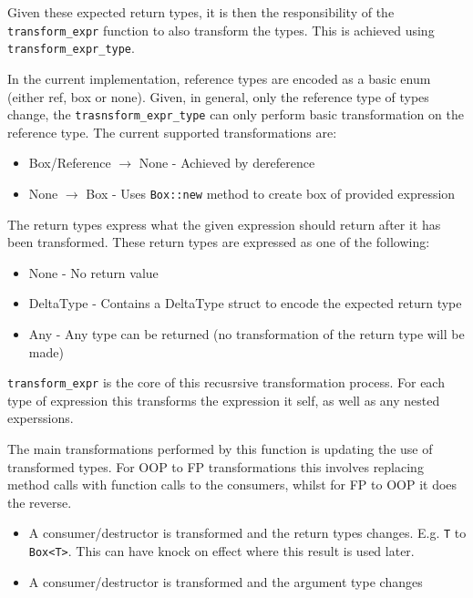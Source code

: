 \documentclass[ oneside,%
                    author={James Elgar},
                    degree={MEng},
                     title={Bidirectional transformer between functional and \\ object-oriented programming in Rust},
                  subtitle={}]{dissertation}
\newcommand{\rust}[1]{\texttt{#1}}
\begin{document}
Given these expected return types, it is then the responsibility of the \verb|transform_expr| function to also transform the types. This is achieved using \verb|transform_expr_type|.  

In the current implementation, reference types are encoded as a basic enum (either ref, box or none). Given, in general, only the reference type of types change, the \verb|trasnsform_expr_type| can only perform basic transformation on the reference type. The current supported transformations are:

\begin{itemize}
    \item Box/Reference $\xrightarrow{}$ None - Achieved by dereference
    \item None $\xrightarrow{}$ Box - Uses \rust{Box::new} method to create box of provided expression
\end{itemize}

The return types express what the given expression should return after it has been transformed. These return types are expressed as one of the following:

\begin{itemize}
    \item None - No return value
    \item DeltaType - Contains a DeltaType struct to encode the expected return type
    \item Any - Any type can be returned (no transformation of the return type will be made)
\end{itemize}



\verb|transform_expr| is the core of this recusrsive transformation process. For each type of expression this transforms the expression it self, as well as any nested experssions.

The main transformations performed by this function is updating the use of transformed types. For OOP to FP transformations this involves replacing method calls with function calls to the consumers, whilst for FP to OOP it does the reverse. 

\begin{itemize}
    \item A consumer/destructor is transformed and the return types changes. E.g. \verb|T| to \verb|Box<T>|. This can have knock on effect where this result is used later.
    \item A consumer/destructor is transformed and the argument type changes
\end{itemize}
\end{document}
